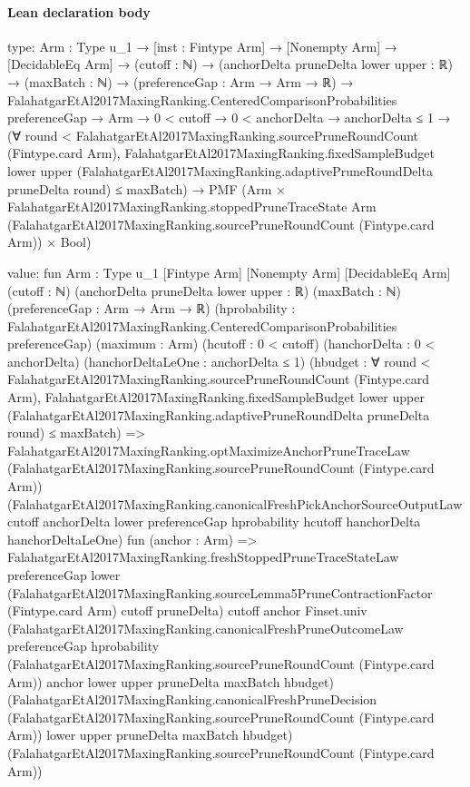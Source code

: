 \documentclass[10pt]{article}
\begin{document}
\paragraph{Lean declaration body}
\begin{ReviewVerbatim}
type:
{Arm : Type u_1} →
  [inst : Fintype Arm] →
    [Nonempty Arm] →
      [DecidableEq Arm] →
        (cutoff : ℕ) →
          (anchorDelta pruneDelta lower upper : ℝ) →
            (maxBatch : ℕ) →
              (preferenceGap : Arm → Arm → ℝ) →
                FalahatgarEtAl2017MaxingRanking.CenteredComparisonProbabilities preferenceGap →
                  Arm →
                    0 < cutoff →
                      0 < anchorDelta →
                        anchorDelta ≤ 1 →
                          (∀ round < FalahatgarEtAl2017MaxingRanking.sourcePruneRoundCount (Fintype.card Arm),
                              FalahatgarEtAl2017MaxingRanking.fixedSampleBudget lower upper
                                  (FalahatgarEtAl2017MaxingRanking.adaptivePruneRoundDelta pruneDelta round) ≤
                                maxBatch) →
                            PMF
                              (Arm ×
                                FalahatgarEtAl2017MaxingRanking.stoppedPruneTraceState Arm
                                    (FalahatgarEtAl2017MaxingRanking.sourcePruneRoundCount (Fintype.card Arm)) ×
                                  Bool)

value:
fun {Arm : Type u_1} [Fintype Arm] [Nonempty Arm] [DecidableEq Arm] (cutoff : ℕ)
    (anchorDelta pruneDelta lower upper : ℝ) (maxBatch : ℕ) (preferenceGap : Arm → Arm → ℝ)
    (hprobability : FalahatgarEtAl2017MaxingRanking.CenteredComparisonProbabilities preferenceGap) (maximum : Arm)
    (hcutoff : 0 < cutoff) (hanchorDelta : 0 < anchorDelta) (hanchorDeltaLeOne : anchorDelta ≤ 1)
    (hbudget :
      ∀ round < FalahatgarEtAl2017MaxingRanking.sourcePruneRoundCount (Fintype.card Arm),
        FalahatgarEtAl2017MaxingRanking.fixedSampleBudget lower upper
            (FalahatgarEtAl2017MaxingRanking.adaptivePruneRoundDelta pruneDelta round) ≤
          maxBatch) =>
  FalahatgarEtAl2017MaxingRanking.optMaximizeAnchorPruneTraceLaw
    (FalahatgarEtAl2017MaxingRanking.sourcePruneRoundCount (Fintype.card Arm))
    (FalahatgarEtAl2017MaxingRanking.canonicalFreshPickAnchorSourceOutputLaw cutoff anchorDelta lower preferenceGap
      hprobability hcutoff hanchorDelta hanchorDeltaLeOne)
    fun (anchor : Arm) =>
    FalahatgarEtAl2017MaxingRanking.freshStoppedPruneTraceStateLaw preferenceGap lower
      (FalahatgarEtAl2017MaxingRanking.sourceLemma5PruneContractionFactor (Fintype.card Arm) cutoff pruneDelta) cutoff
      anchor Finset.univ
      (FalahatgarEtAl2017MaxingRanking.canonicalFreshPruneOutcomeLaw preferenceGap hprobability
        (FalahatgarEtAl2017MaxingRanking.sourcePruneRoundCount (Fintype.card Arm)) anchor lower upper pruneDelta
        maxBatch hbudget)
      (FalahatgarEtAl2017MaxingRanking.canonicalFreshPruneDecision
        (FalahatgarEtAl2017MaxingRanking.sourcePruneRoundCount (Fintype.card Arm)) lower upper pruneDelta maxBatch
        hbudget)
      (FalahatgarEtAl2017MaxingRanking.sourcePruneRoundCount (Fintype.card Arm))
\end{ReviewVerbatim}
\end{document}
